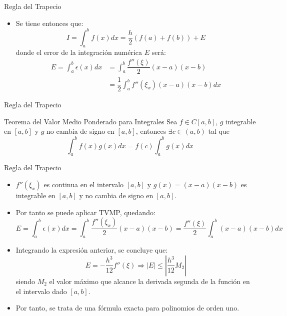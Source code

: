 \documentclass[12pt]{beamer}
\begin{document}
\begin{frame}{Regla del Trapecio}
  \begin{itemize}
    \item Se tiene entonces que:
    $$
    I = \int_a^bf(x)dx = \dfrac{h}{2}(f(a)+f(b)) + E
    $$
    donde el error de la integraci\'on num\'erica $E$ ser\'a:
    \begin{align*}
      E = \int_a^b\epsilon(x)dx  &= \int_a^b \dfrac{f''(\xi)}{2}(x-a)(x-b)\\
      &= \dfrac{1}{2}\int_a^bf''(\xi_x)(x-a)(x-b)dx  
    \end{align*}    
  \end{itemize}
\end{frame}
\begin{frame}{Regla del Trapecio}
  \begin{block}{Teorema del Valor Medio Ponderado para Integrales}
    Sea $f \in C[a,b]$, $g$ integrable en $[a,b]$ y $g$ no cambia de signo en $[a,b]$, entonces $\exists c \in (a,b)$ tal que
    $$
    \int_a^bf(x)g(x)dx = f(c)\int_a^bg(x)dx
    $$
    \end{block}
  \end{frame}
  \begin{frame}{Regla del Trapecio}
    \begin{itemize}
      \item <1-> $f''(\xi_x)$ es continua en el intervalo $[a,b]$ y $g(x)=(x-a)(x-b)$ es integrable en $[a,b]$ y no cambia de signo en $[a,b]$.
      \item<2->Por tanto se puede aplicar TVMP, quedando:
      \small{
      $$
      E = \int_a^b\epsilon(x)dx = \int_a^b \dfrac{f''(\xi_x)}{2}(x-a)(x-b) = \dfrac{f''(\xi)}{2}\int_a^b(x-a)(x-b)dx       
      $$}
      \item<3->Integrando la expresi\'on anterior, se concluye que:
      $$
      E = -\dfrac{h^3}{12}f''(\xi) \Rightarrow |E| \leq \left|\dfrac{h^3}{12}M_2\right|
      $$
      siendo $M_2$ el valor m\'aximo que alcance la derivada segunda de la funci\'on en el intervalo dado $[a, b]$.
      \item<4-> Por tanto, se trata de una f\'ormula exacta para polinomios de orden uno.
    \end{itemize}
  \end{frame}
\end{document}
